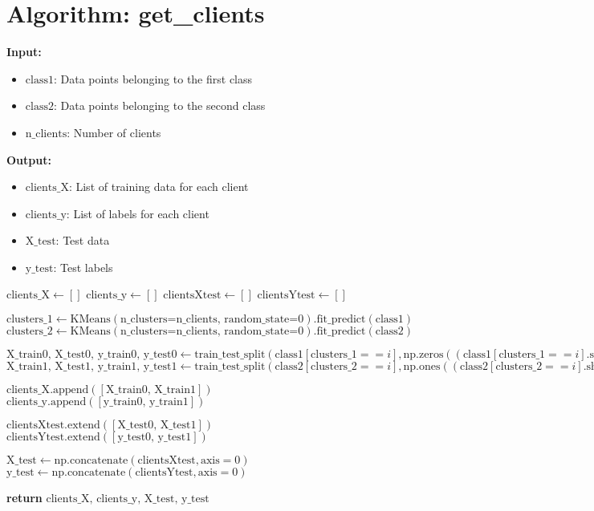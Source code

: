 \documentclass{article}
\begin{document}
\section*{Algorithm: get\_clients}

\textbf{Input:}
\begin{itemize}
    \item $\text{class1}$: Data points belonging to the first class
    \item $\text{class2}$: Data points belonging to the second class
    \item $\text{n\_clients}$: Number of clients
\end{itemize}

\textbf{Output:}
\begin{itemize}
    \item $\text{clients\_X}$: List of training data for each client
    \item $\text{clients\_y}$: List of labels for each client
    \item $\text{X\_test}$: Test data
    \item $\text{y\_test}$: Test labels
\end{itemize}

\begin{algorithmic}[1]
    \State $\text{clients\_X} \gets []$
    \State $\text{clients\_y} \gets []$
    \State $\text{clientsXtest} \gets []$
    \State $\text{clientsYtest} \gets []$

    \State $\text{clusters\_1} \gets \text{KMeans}(\text{n\_clusters=n\_clients, random\_state=0}).\text{fit\_predict}(\text{class1})$
    \State $\text{clusters\_2} \gets \text{KMeans}(\text{n\_clusters=n\_clients, random\_state=0}).\text{fit\_predict}(\text{class2})$

        \State $\text{X\_train0, X\_test0, y\_train0, y\_test0} \gets \text{train\_test\_split}(\text{class1}[\text{clusters\_1} == i], \text{np.zeros}((\text{class1}[\text{clusters\_1} == i].\text{shape}[0],)), \text{test\_size}=0.2)$
        \State $\text{X\_train1, X\_test1, y\_train1, y\_test1} \gets \text{train\_test\_split}(\text{class2}[\text{clusters\_2} == i], \text{np.ones}((\text{class2}[\text{clusters\_2} == i].\text{shape}[0],)), \text{test\_size}=0.2)$

        \State $\text{clients\_X}.\text{append}([\text{X\_train0, X\_train1}])$
        \State $\text{clients\_y}.\text{append}([\text{y\_train0, y\_train1}])$

        \State $\text{clientsXtest}.\text{extend}([\text{X\_test0, X\_test1}])$
        \State $\text{clientsYtest}.\text{extend}([\text{y\_test0, y\_test1}])$
    \EndFor

    \State $\text{X\_test} \gets \text{np.concatenate}(\text{clientsXtest}, \text{axis}=0)$
    \State $\text{y\_test} \gets \text{np.concatenate}(\text{clientsYtest}, \text{axis}=0)$

    \State \textbf{return} $\text{clients\_X, clients\_y, X\_test, y\_test}$
\EndProcedure
\end{algorithmic}
\end{document}
